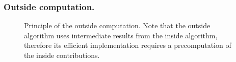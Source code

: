 \subsubsection{Outside computation.}	
\begin{figure}[t]
\begin{minipage}{0.79\textwidth}
\resizebox{\textwidth}{!}{}
\end{minipage}
\begin{minipage}{0.20\textwidth}
\caption{Principle of the outside computation. Note that the outside algorithm uses intermediate results from the inside algorithm, 
therefore its efficient implementation requires a precomputation of the inside contributions.}
\end{minipage}
\SpaceCheating
\end{figure}

